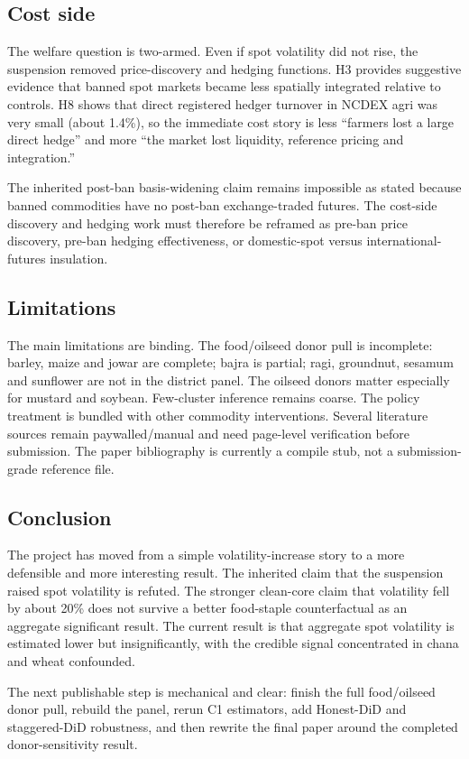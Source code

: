 \subsection{Cost side}

The welfare question is two-armed. Even if spot volatility did not rise, the suspension
removed price-discovery and hedging functions. H3 provides suggestive evidence that banned
spot markets became less spatially integrated relative to controls. H8 shows that direct
registered hedger turnover in NCDEX agri was very small (about 1.4\%), so the immediate
cost story is less ``farmers lost a large direct hedge'' and more ``the market lost liquidity,
reference pricing and integration.''

The inherited post-ban basis-widening claim remains impossible as stated because banned
commodities have no post-ban exchange-traded futures. The cost-side discovery and hedging
work must therefore be reframed as pre-ban price discovery, pre-ban hedging effectiveness,
or domestic-spot versus international-futures insulation.

\subsection{Limitations}

The main limitations are binding. The food/oilseed donor pull is incomplete: barley, maize
and jowar are complete; bajra is partial; ragi, groundnut, sesamum and sunflower are not in
the district panel. The oilseed donors matter especially for mustard and soybean. Few-cluster
inference remains coarse. The policy treatment is bundled with other commodity interventions.
Several literature sources remain paywalled/manual and need page-level verification before
submission. The paper bibliography is currently a compile stub, not a submission-grade
reference file.

\subsection{Conclusion}

The project has moved from a simple volatility-increase story to a more defensible and more
interesting result. The inherited claim that the suspension raised spot volatility is refuted.
The stronger clean-core claim that volatility fell by about 20\% does not survive a better
food-staple counterfactual as an aggregate significant result. The current result is that
aggregate spot volatility is estimated lower but insignificantly, with the credible signal
concentrated in chana and wheat confounded.

The next publishable step is mechanical and clear: finish the full food/oilseed donor pull,
rebuild the panel, rerun C1 estimators, add Honest-DiD and staggered-DiD robustness, and then
rewrite the final paper around the completed donor-sensitivity result.
